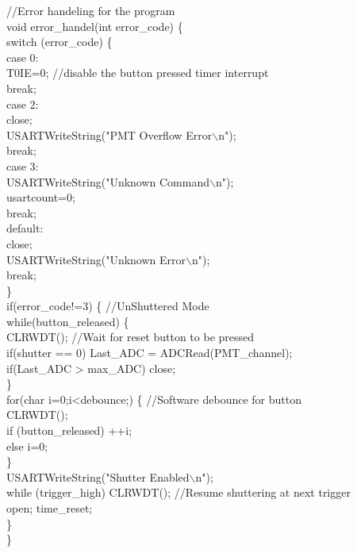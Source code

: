 //Error handeling for the program\\
void error\_handel(int error\_code) \{  \\	
\tabto*{.5cm}	switch (error\_code) \{\\	
\tabto*{1cm}		case 0:\\
\tabto*{1.5cm}		T0IE=0;  \tabto*{7.5cm}//disable the button pressed timer interrupt\\
\tabto*{1.5cm}		break;\\
\tabto*{1cm}		case 2:\\
\tabto*{1.5cm}		close;\\
\tabto*{1.5cm}		USARTWriteString("PMT Overflow Error$\backslash$n");\\
\tabto*{1.5cm}		break;\\
\tabto*{1cm}		case 3:\\
\tabto*{1.5cm}		USARTWriteString("Unknown Command$\backslash$n");\\
\tabto*{1.5cm}		usartcount=0;\\
\tabto*{1.5cm}		break;\\
\tabto*{1cm}		default:\\
\tabto*{1.5cm}		close;\\
\tabto*{1.5cm}		USARTWriteString("Unknown Error$\backslash$n");\\
\tabto*{1.5cm}		break;\\
\tabto*{.5cm}	\}\\
\tabto*{.5cm}	if(error\_code!=3) \{     \tabto*{7.5cm} //UnShuttered Mode\\
\tabto*{1cm}		while(button\_released) \{\\
\tabto*{1.5cm}			CLRWDT();  //Wait for reset button to be pressed\\
\tabto*{1.5cm}			if(shutter == 0) Last\_ADC = ADCRead(PMT\_channel);\\
\tabto*{1.5cm}			if(Last\_ADC > max\_ADC) close;  \\
\tabto*{1cm}		\}\\
\tabto*{1cm}		for(char i=0;i<debounce;) \{   \tabto*{7.5cm} //Software debounce for button\\      
\tabto*{1.5cm}			CLRWDT();\\
\tabto*{1.5cm}			if (button\_released) ++i;\\
\tabto*{1.5cm}			else i=0;\\
\tabto*{1cm}		\}\\
\tabto*{1cm}		USARTWriteString("Shutter Enabled$\backslash$n");\\
\tabto*{1cm}		while (trigger\_high) CLRWDT();  \tabto*{7.5cm} //Resume shuttering at next trigger \\
\tabto*{1cm}		open; time\_reset;   \\       
\tabto*{.5cm}	\}\\	
\}\\\\

